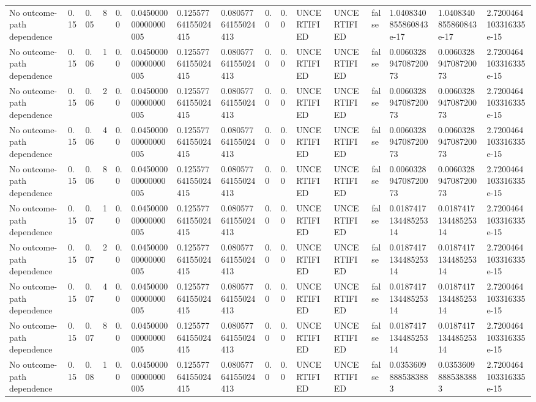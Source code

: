 \begin{tabular}{llllllllllllllll}
No outcome-path dependence & 0.15 & 0.05 & 8 & 0.0 & 0.045000000000000005 & 0.12557764155024415 & 0.08057764155024413 & 0.0 & 0.0 & UNCERTIFIED & UNCERTIFIED & false & 1.0408340855860843e-17 & 1.0408340855860843e-17 & 2.7200464103316335e-15 \\
No outcome-path dependence & 0.15 & 0.06 & 1 & 0.0 & 0.045000000000000005 & 0.12557764155024415 & 0.08057764155024413 & 0.0 & 0.0 & UNCERTIFIED & UNCERTIFIED & false & 0.006032894708720073 & 0.006032894708720073 & 2.7200464103316335e-15 \\
No outcome-path dependence & 0.15 & 0.06 & 2 & 0.0 & 0.045000000000000005 & 0.12557764155024415 & 0.08057764155024413 & 0.0 & 0.0 & UNCERTIFIED & UNCERTIFIED & false & 0.006032894708720073 & 0.006032894708720073 & 2.7200464103316335e-15 \\
No outcome-path dependence & 0.15 & 0.06 & 4 & 0.0 & 0.045000000000000005 & 0.12557764155024415 & 0.08057764155024413 & 0.0 & 0.0 & UNCERTIFIED & UNCERTIFIED & false & 0.006032894708720073 & 0.006032894708720073 & 2.7200464103316335e-15 \\
No outcome-path dependence & 0.15 & 0.06 & 8 & 0.0 & 0.045000000000000005 & 0.12557764155024415 & 0.08057764155024413 & 0.0 & 0.0 & UNCERTIFIED & UNCERTIFIED & false & 0.006032894708720073 & 0.006032894708720073 & 2.7200464103316335e-15 \\
No outcome-path dependence & 0.15 & 0.07 & 1 & 0.0 & 0.045000000000000005 & 0.12557764155024415 & 0.08057764155024413 & 0.0 & 0.0 & UNCERTIFIED & UNCERTIFIED & false & 0.018741713448525314 & 0.018741713448525314 & 2.7200464103316335e-15 \\
No outcome-path dependence & 0.15 & 0.07 & 2 & 0.0 & 0.045000000000000005 & 0.12557764155024415 & 0.08057764155024413 & 0.0 & 0.0 & UNCERTIFIED & UNCERTIFIED & false & 0.018741713448525314 & 0.018741713448525314 & 2.7200464103316335e-15 \\
No outcome-path dependence & 0.15 & 0.07 & 4 & 0.0 & 0.045000000000000005 & 0.12557764155024415 & 0.08057764155024413 & 0.0 & 0.0 & UNCERTIFIED & UNCERTIFIED & false & 0.018741713448525314 & 0.018741713448525314 & 2.7200464103316335e-15 \\
No outcome-path dependence & 0.15 & 0.07 & 8 & 0.0 & 0.045000000000000005 & 0.12557764155024415 & 0.08057764155024413 & 0.0 & 0.0 & UNCERTIFIED & UNCERTIFIED & false & 0.018741713448525314 & 0.018741713448525314 & 2.7200464103316335e-15 \\
No outcome-path dependence & 0.15 & 0.08 & 1 & 0.0 & 0.045000000000000005 & 0.12557764155024415 & 0.08057764155024413 & 0.0 & 0.0 & UNCERTIFIED & UNCERTIFIED & false & 0.03536098885383883 & 0.03536098885383883 & 2.7200464103316335e-15 \\

\end{tabular}
